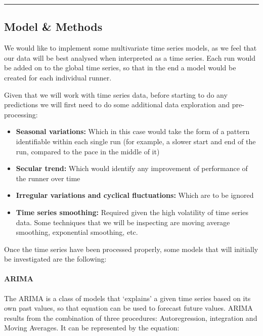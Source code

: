 \documentclass[
  12pt,
]{article}
\begin{document}
\begin{center}\rule{0.5\linewidth}{0.5pt}\end{center}

\hypertarget{model-methods}{%
\subsection{Model \& Methods}\label{model-methods}}

We would like to implement some multivariate time series models, as we
feel that our data will be best analysed when interpreted as a time
series. Each run would be added on to the global time series, so that in
the end a model would be created for each individual runner.

Given that we will work with time series data, before starting to do any
predictions we will first need to do some additional data exploration
and pre-processing:

\begin{itemize}
\item \textbf{Seasonal variations:} Which in this case would take the form of a pattern identifiable within each single run (for example, a slower start and end of the run, compared to the pace in the middle of it)
\item \textbf{Secular trend:} Which would identify any improvement of performance of the runner over time
\item \textbf{Irregular variations and cyclical fluctuations:} Which are to be ignored
\item \textbf{Time series smoothing:} Required given the high volatility of time series data. Some techniques that we will be inspecting are moving average smoothing, exponential smoothing, etc.
\end{itemize}

Once the time series have been processed properly, some models that will
initially be investigated are the following:

\paragraph{ARIMA}

The ARIMA is a class of models that `explains' a given time series based
on its own past values, so that equation can be used to forecast future
values. ARIMA results from the combination of three procedures:
Autoregression, integration and Moving Averages. It can be represented
by the equation:
\end{document}
